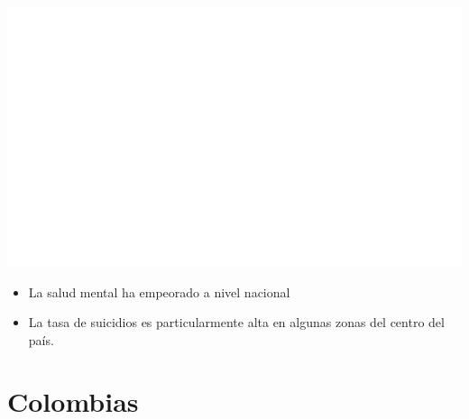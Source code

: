 \documentclass[aspectratio=169]{beamer}
\begin{document}
        \begin{slide}{15} 
            \begin{imagecolumn}
                \includegraphics[width=\columnwidth]{img/var_294_map.png}
            \end{imagecolumn}
            \begin{textcolumn}
                \begin{itemize}
                    \item La salud mental ha empeorado a nivel nacional
                    \item La tasa de suicidios es particularmente alta en algunas zonas del centro del país.
                \end{itemize}
            \end{textcolumn}
    \printcolumns
    \end{slide}
    
      \section{Colombias}
    
\end{document}

